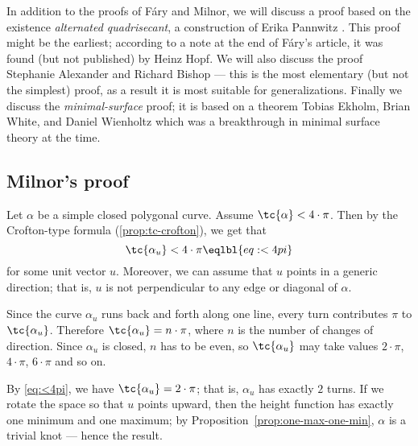 In addition to the proofs of F\'ary and Milnor,
we will discuss a proof based on the existence \emph{alternated quadrisecant}, a construction of Erika Pannwitz \cite{pannwitz}.
This proof might be the earliest; according to a note at the end of Fáry’s article, it was found (but not published) by Heinz Hopf.
We will also discuss the proof Stephanie Alexander and Richard Bishop --- this is the most elementary (but not the simplest) proof, as a result it is most suitable for generalizations.
Finally we discuss the \emph{minimal-surface} proof;
it is based on a theorem Tobias Ekholm, Brian White, and Daniel Wienholtz \cite{EWW_embed} which was a breakthrough in minimal surface theory at the time.
































\subsection*{Milnor's proof}

Let $\alpha$ be a simple closed polygonal curve.
Assume $\tc{\alpha}<4\cdot\pi$.
Then by the Crofton-type formula (\ref{prop:tc-crofton}), we get that
\[\tc{\alpha_u}<4\cdot\pi
\eqlbl{eq:<4pi}\]
for some unit vector $u$.
Moreover, we can assume that $u$ points in a generic direction;
that is, $u$ is not perpendicular to any edge or diagonal of $\alpha$.

Since the curve $\alpha_u$ runs back and forth along one line, 
every turn contributes $\pi$ to  $\tc{\alpha_u}$.
Therefore $\tc{\alpha_u}=n\cdot\pi$, where $n$ is the number of changes of direction.
Since $\alpha_u$ is closed, $n$ has to be even, so $\tc{\alpha_u}$ may take values $2\cdot\pi$, $4\cdot\pi$, $6\cdot\pi$ and so on.

By \ref{eq:<4pi}, we have $\tc{\alpha_u}= 2\cdot\pi$;
that is, $\alpha_u$ has exactly $2$ turns.
If we rotate the space so that $u$ points upward,
then the height function has exactly one minimum and one maximum;
by Proposition~\ref{prop:one-max-one-min}, $\alpha$ is a trivial knot --- hence the result.
\qeds

























